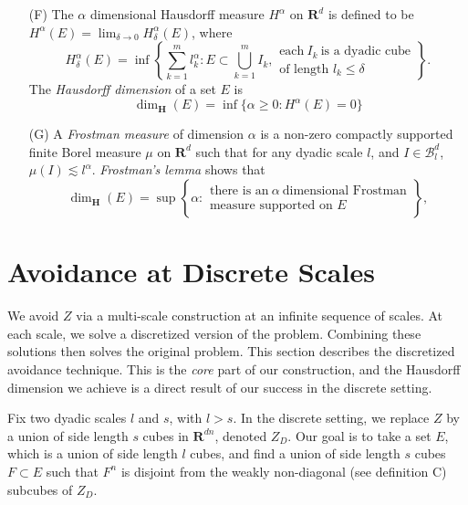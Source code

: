 \documentclass[dvipsnames]{article}
\theoremstyle{plain}
\theoremstyle{plain}
\begin{document}
\begin{enumerate}
	\item[(F)] The $\alpha$ dimensional Hausdorff measure $H^\alpha$ on $\mathbf{R}^d$ is defined to be $H^\alpha(E) = \lim_{\delta \to 0} H^\alpha_\delta(E)$, where
	\begin{equation} \label{hausdorffdef}
		H^\alpha_\delta(E) = \inf \left\{ \sum_{k = 1}^m l_k^\alpha : E \subset \bigcup_{k = 1}^m I_k, \begin{array}{c} \text{each}\ I_k\ \text{is a dyadic cube}\\
		\text{of length $l_k \leq \delta$} \end{array} \right\}.
	\end{equation}
	The {\it Hausdorff dimension} of a set $E$ is
	\[ \dim_{\mathbf{H}}(E) = \inf \{ \alpha \geq 0 : H^\alpha(E) = 0 \} \]


	\item[(G)] A {\it Frostman measure} of dimension $\alpha$ is a non-zero compactly supported finite Borel measure $\mu$ on $\mathbf{R}^d$ such that for any dyadic scale $l$, and $I \in \mathcal{B}^d_l$, $\mu(I) \lesssim l^\alpha$. {\it Frostman's lemma} shows that
	\begin{equation} \label{frostmandef}
		\dim_{\mathbf{H}}(E) = \sup \left\{ \alpha: \begin{array}{c} \text{there is an}\ \alpha\ \text{dimensional Frostman}\\
	\text{measure supported on $E$} \end{array} \right\},
	\end{equation}
\end{enumerate}










\section{Avoidance at Discrete Scales}

We avoid $Z$ via a multi-scale construction at an infinite sequence of scales. At each scale, we solve a discretized version of the problem. Combining these solutions then solves the original problem. This section describes the discretized avoidance technique. This is the {\it core} part of our construction, and the Hausdorff dimension we achieve is a direct result of our success in the discrete setting.

Fix two dyadic scales $l$ and $s$, with $l > s$. In the discrete setting, we replace $Z$ by a union of side length $s$ cubes in $\mathbf{R}^{dn}$, denoted $Z_D$. Our goal is to take a set $E$, which is a union of side length $l$ cubes, and find a union of side length $s$ cubes $F \subset E$ such that $F^n$ is disjoint from the weakly non-diagonal (see definition C) subcubes of $Z_D$.
\end{document}
